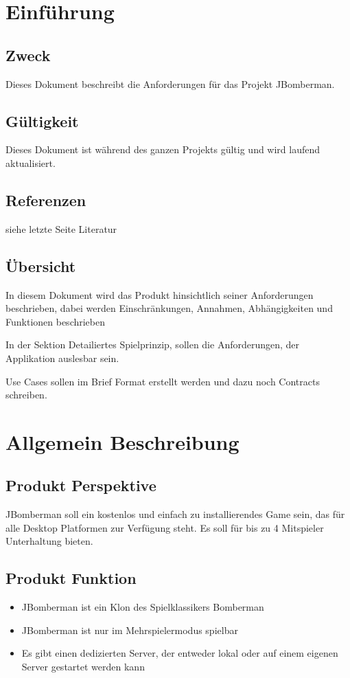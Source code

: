 \documentclass[11pt]{scrartcl}
\begin{document}
\newpage
\tableofcontents
\newpage
\section{Einführung}
\label{sec:Einführung}
\subsection{Zweck}
\label{sec:Zweck}
Dieses Dokument beschreibt die Anforderungen für das Projekt JBomberman.
\subsection{Gültigkeit}
\label{sec:Gültigkeit}
Dieses Dokument ist während des ganzen Projekts gültig und wird laufend aktualisiert.
\subsection{Referenzen}
\label{sec:Referenzen}
siehe letzte Seite Literatur

\subsection{Übersicht}
\label{sec:Übersicht}
In diesem Dokument wird das Produkt hinsichtlich seiner Anforderungen beschrieben, dabei werden Einschränkungen, Annahmen, Abhängigkeiten und Funktionen beschrieben

In der Sektion Detailiertes Spielprinzip, sollen die Anforderungen, der Applikation auslesbar sein.

Use Cases sollen im Brief Format erstellt werden und dazu noch Contracts schreiben.
\section{Allgemein Beschreibung}
\label{sec:Allgemeine Beschreibung}

\subsection{Produkt Perspektive}
\label{sec:Produkt Perspektive}
JBomberman soll ein kostenlos und einfach zu installierendes Game sein, das für alle Desktop Platformen zur Verfügung steht.
Es soll für bis zu 4 Mitspieler Unterhaltung bieten.
\subsection{Produkt Funktion}
\label{sec:Produkt Funktion}
\begin{itemize}
    \item JBomberman ist ein Klon des Spielklassikers Bomberman
    \item JBomberman ist nur im Mehrspielermodus spielbar
    \item Es gibt einen dedizierten Server, der entweder lokal oder auf einem eigenen Server gestartet werden kann
\end{itemize}
\end{document}
